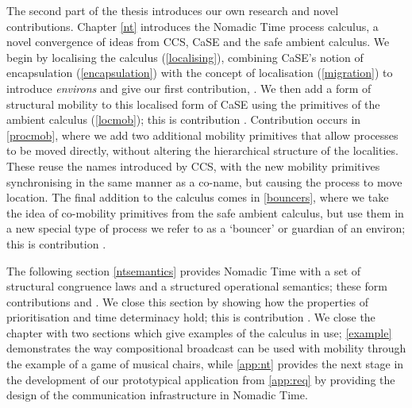 The second part of the thesis introduces our own research and novel
contributions.  Chapter \ref{nt} introduces the Nomadic Time process
calculus, a novel convergence of ideas from CCS, CaSE and the safe
ambient calculus.  We begin by localising the calculus
(\ref{localising}), combining CaSE's notion of encapsulation
(\ref{encapsulation}) with the concept of localisation
(\ref{migration}) to introduce \emph{environs} and give our first
contribution, .  We then add a form of structural mobility
to this localised form of CaSE using the primitives of the ambient
calculus (\ref{locmob}); this is contribution .
Contribution  occurs in \ref{procmob}, where we add two
additional mobility primitives that allow processes to be moved
directly, without altering the hierarchical structure of the
localities.  These reuse the names introduced by CCS, with the new
mobility primitives synchronising in the same manner as a co-name, but
causing the process to move location.  The final addition to the
calculus comes in \ref{bouncers}, where we take the idea of
co-mobility primitives from the safe ambient calculus, but use them in
a new special type of process we refer to as a `bouncer' or guardian
of an environ; this is contribution .

The following section \ref{ntsemantics} provides Nomadic Time with a
set of structural congruence laws and a structured operational
semantics; these form contributions  and .  We
close this section by showing how the properties of prioritisation and
time determinacy hold; this is contribution .  We close the
chapter with two sections which give examples of the calculus in use;
\ref{example} demonstrates the way compositional broadcast can be used
with mobility through the example of a game of musical chairs, while
\ref{app:nt} provides the next stage in the development of our
prototypical application from \ref{app:req} by providing the design of
the communication infrastructure in Nomadic Time.

